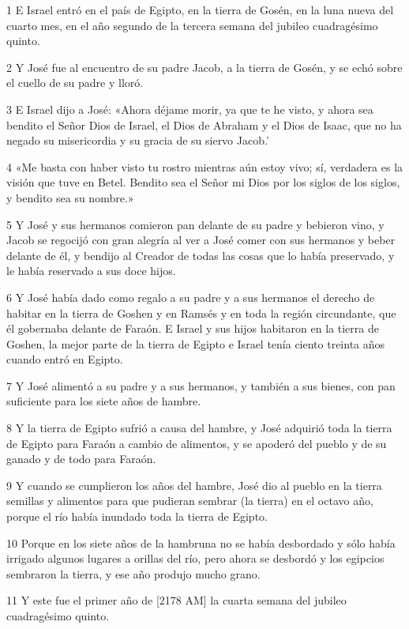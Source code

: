\par 1 E Israel entró en el país de Egipto, en la tierra de Gosén, en la luna nueva del cuarto mes, en el año segundo de la tercera semana del jubileo cuadragésimo quinto.
\par 2 Y José fue al encuentro de su padre Jacob, a la tierra de Gosén, y se echó sobre el cuello de su padre y lloró.
\par 3 E Israel dijo a José: «Ahora déjame morir, ya que te he visto, y ahora sea bendito el Señor Dios de Israel, el Dios de Abraham y el Dios de Isaac, que no ha negado su misericordia y su gracia de su siervo Jacob.'
\par 4 «Me basta con haber visto tu rostro mientras aún estoy vivo; sí, verdadera es la visión que tuve en Betel. Bendito sea el Señor mi Dios por los siglos de los siglos, y bendito sea su nombre.»
\par 5 Y José y sus hermanos comieron pan delante de su padre y bebieron vino, y Jacob se regocijó con gran alegría al ver a José comer con sus hermanos y beber delante de él, y bendijo al Creador de todas las cosas que lo había preservado, y le había reservado a sus doce hijos.
\par 6 Y José había dado como regalo a su padre y a sus hermanos el derecho de habitar en la tierra de Goshen y en Ramsés y en toda la región circundante, que él gobernaba delante de Faraón. E Israel y sus hijos habitaron en la tierra de Goshen, la mejor parte de la tierra de Egipto e Israel tenía ciento treinta años cuando entró en Egipto.
\par 7 Y José alimentó a su padre y a sus hermanos, y también a sus bienes, con pan suficiente para los siete años de hambre.
\par 8 Y la tierra de Egipto sufrió a causa del hambre, y José adquirió toda la tierra de Egipto para Faraón a cambio de alimentos, y se apoderó del pueblo y de su ganado y de todo para Faraón.
\par 9 Y cuando se cumplieron los años del hambre, José dio al pueblo en la tierra semillas y alimentos para que pudieran sembrar (la tierra) en el octavo año, porque el río había inundado toda la tierra de Egipto.
\par 10 Porque en los siete años de la hambruna no se había desbordado y sólo había irrigado algunos lugares a orillas del río, pero ahora se desbordó y los egipcios sembraron la tierra, y ese año produjo mucho grano.
\par 11 Y este fue el primer año de [2178 AM] la cuarta semana del jubileo cuadragésimo quinto.
